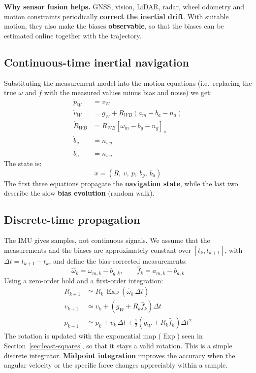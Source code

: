 \textbf{Why sensor fusion helps.} GNSS, vision, LiDAR, radar, wheel odometry and motion constraints periodically \textbf{correct the inertial drift}. With suitable motion, they also make the biases \textbf{observable}, so that the biases can be estimated online together with the trajectory.

\subsection{Continuous-time inertial navigation}
Substituting the measurement model into the motion equations (i.e.\ replacing the true $\omega$ and $f$ with the measured values minus bias and noise) we get:
\[
\begin{aligned}
\dot p_W &= v_W\\
\dot v_W &= g_W + R_{WB}\left(a_m - b_a - n_a\right)\\
\dot R_{WB} &= R_{WB}\left[\omega_m - b_g - n_g\right]_\times\\
\dot b_g &= n_{wg}\\
\dot b_a &= n_{wa}
\end{aligned}
\]
The state is:
\[
x = \left(R,\ v,\ p,\ b_g,\ b_a\right)
\]
The first three equations propagate the \textbf{navigation state}, while the last two describe the slow \textbf{bias evolution} (random walk).

\subsection{Discrete-time propagation}
The IMU gives samples, not continuous signals. We assume that the measurements and the biases are approximately constant over $[t_k, t_{k+1}]$, with $\Delta t = t_{k+1} - t_k$, and define the bias-corrected measurements:
\[
\hat\omega_k = \omega_{m,k} - b_{g,k}, \qquad \hat f_k = a_{m,k} - b_{a,k}
\]
Using a zero-order hold and a first-order integration:
\[
\begin{aligned}
R_{k+1} &\simeq R_k\, \operatorname{Exp}\!\left(\hat\omega_k\, \Delta t\right)\\
v_{k+1} &\simeq v_k + \left(g_W + R_k \hat f_k\right) \Delta t\\
p_{k+1} &\simeq p_k + v_k\, \Delta t + \frac{1}{2}\left(g_W + R_k \hat f_k\right) \Delta t^2
\end{aligned}
\]
The rotation is updated with the exponential map ($\operatorname{Exp}$) seen in Section~\ref{sec:least-squares}, so that it stays a valid rotation. This is a simple discrete integrator. \textbf{Midpoint integration} improves the accuracy when the angular velocity or the specific force changes appreciably within a sample.

